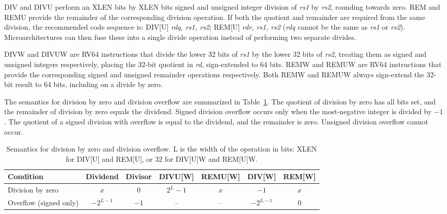 DIV and DIVU perform an XLEN bits by XLEN bits signed and unsigned integer
division of {\em rs1} by {\em rs2}, rounding towards zero.
REM and REMU provide the remainder of the
corresponding division operation.  If both the quotient and remainder
are required from the same division, the recommended code sequence is:
DIV[U] {\em rdq, rs1, rs2}; REM[U] {\em rdr, rs1, rs2} ({\em rdq}
cannot be the same as {\em rs1} or {\em rs2}).  Microarchitectures can
then fuse these into a single divide operation instead of performing
two separate divides.

DIVW and DIVUW are RV64 instructions that divide the
lower 32 bits of {\em rs1} by the lower 32 bits of {\em rs2}, treating
them as signed and unsigned integers respectively, placing the 32-bit
quotient in {\em rd}, sign-extended to 64 bits.  REMW and REMUW
are RV64 instructions that provide the corresponding
signed and unsigned remainder operations respectively. Both REMW and
REMUW always sign-extend the 32-bit result to 64 bits, including on a
divide by zero.

The semantics for division by zero and division overflow are summarized in
Table~\ref{tab:divby0}.  The quotient of division by zero has all bits set, and
the remainder of division by zero equals the dividend.  Signed division overflow
occurs only when the most-negative integer is divided by $-1$.  The quotient of
a signed division with overflow is equal to the dividend, and the remainder is
zero. Unsigned division overflow cannot occur.

\vspace{0.1in}
\begin{table}[h]
\center
\begin{tabular}{|l|c|c||c|c|c|c|}
\hline
Condition              & Dividend   & Divisor & DIVU[W]   & REMU[W] & DIV[W]     & REM[W] \\ \hline
Division by zero       & $x$        & 0       & $2^{L}-1$ & $x$     & $-1$       & $x$    \\
Overflow (signed only) & $-2^{L-1}$ & $-1$    & --        & --      & $-2^{L-1}$ & 0      \\
\hline
\end{tabular}
\caption{Semantics for division by zero and division overflow.
L is the width of the operation in bits: XLEN for DIV[U] and REM[U], or
32 for DIV[U]W and REM[U]W.}
\label{tab:divby0}
\end{table}


